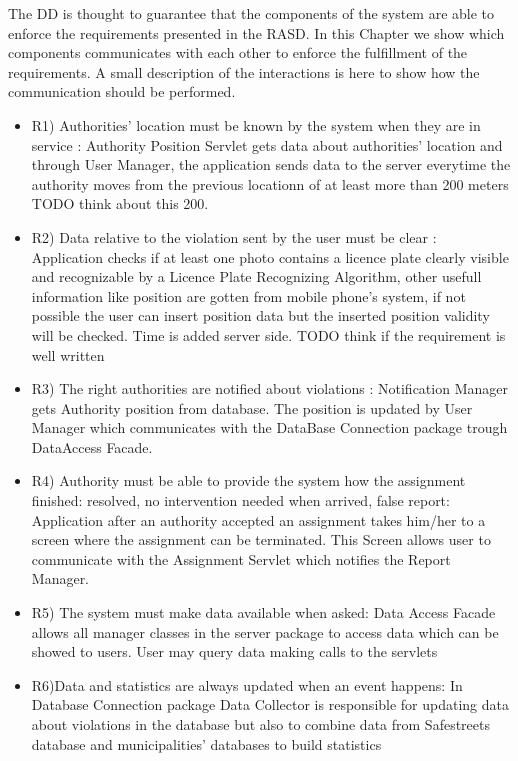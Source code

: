 The DD is thought to guarantee that the components of the system are able to enforce the requirements presented in the RASD.
\newline
In this Chapter we show which components communicates with each other to enforce the fulfillment of the requirements.
A small description of the interactions is here to show how the communication should be performed.  
\begin{itemize}
 \item R1) Authorities’ location must be known by the system when they are in service : Authority Position Servlet gets data about authorities' location and through User Manager, the  application sends data to the server everytime the authority moves from the previous locationn of at least more than 200 meters TODO think about this 200.  
\item  R2) Data relative to the violation sent by the user must be clear : Application checks if at least one photo contains a licence plate clearly visible and recognizable by a Licence Plate Recognizing Algorithm, other usefull information like position are gotten from mobile phone's system, if not possible the user can insert position data but the inserted position validity will be checked. Time is added server side. TODO think if the requirement is well written
 \item R3) The right authorities are notified about violations : Notification Manager gets Authority position from database. The position is updated by User Manager which communicates with the DataBase Connection package trough DataAccess Facade.
 \item R4) Authority must be able to provide the system how the assignment finished: resolved, no intervention needed when arrived, false report: Application after an authority accepted an assignment takes him/her to a screen where the assignment can be terminated.
This Screen allows user to communicate with the Assignment Servlet which notifies the Report Manager.
 \item R5) The system must make data available when asked: Data Access Facade allows all manager classes in the server package to access data which can be showed to users. User may query data making calls to the servlets
 \item R6)Data and statistics are always updated when an event happens: In Database Connection package Data Collector is responsible for updating data about violations in the database but also to combine data from Safestreets database and municipalities' databases to build statistics

\end{itemize}
